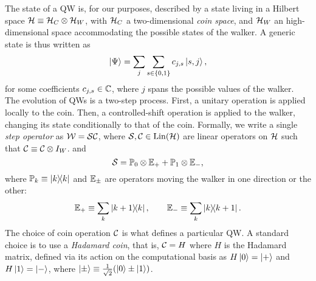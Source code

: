 The state of a QW is, for our purposes, described by a state living in a Hilbert space ${\mathcal{H}}\equiv{\mathcal{H}}_C\otimes{\mathcal{H}}_W$, with ${\mathcal{H}}_C$ a two-dimensional \emph{coin space}, and ${\mathcal{H}}_W$ an high-dimensional space accommodating the possible states of the walker.
A generic state is thus written as
\begin{equation}
    \ket\Psi = \sum_j \sum_{s\in\{0,1\}} c_{j,s} \ket{s, j},
\end{equation}
for some coefficients $c_{j,s}\in{\mathbb{C}}$, where $j$ spans the possible values of the walker.
The evolution of \acp{QW} is a two-step process.
First, a unitary operation is applied locally to the coin.
Then, a controlled-shift operation is applied to the walker, changing its state conditionally to that of the coin.
Formally, we write a single \textit{step operator} as ${\mathcal{W}}={\mathcal{S}}{\mathcal{C}}$, where ${\mathcal{S}},{\mathcal{C}}\in\operatorname{Lin}({\mathcal{H}})$ are linear operators on ${\mathcal{H}}$ such that ${\mathcal{C}}\equiv{\mathcal{C}}\otimes I_W$.
and
\begin{equation}
    {\mathcal{S}} = {\mathbb{P}}_0\otimes {\mathbb{E}}_+ + {\mathbb{P}}_1\otimes {\mathbb{E}}_-,
    \label{eq:qws_shitty_definition_cshift}
\end{equation}
where ${\mathbb{P}}_k\equiv\ketbra k$ and ${\mathbb{E}}_\pm$ are operators moving the walker in one direction or the other:
\begin{equation}
    {\mathbb{E}}_+\equiv \sum_k \ketbra{k+1}{k},
    \qquad
    {\mathbb{E}}_-\equiv\sum_k\ketbra{k}{k+1}.
\end{equation}
The choice of coin operation ${\mathcal{C}}$ is what defines a particular \ac{QW}.
A standard choice is to use a \textit{Hadamard coin}, that is, ${\mathcal{C}}=H$ where $H$ is the Hadamard matrix, defined via its action on the computational basis as
$H\ket0=\ket+$ and $H\ket1=\ket-$, where $\ket\pm\equiv\frac{1}{\sqrt2}(\ket0\pm\ket1)$.

